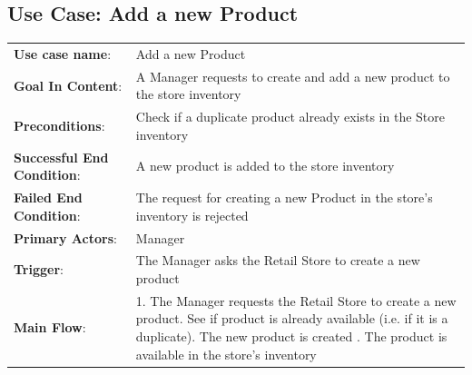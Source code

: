 \documentclass[12pt]{article}
\begin{document}
\subsection*{Use Case: Add a new Product}
\begin{center}
\begin{tabular}{ l p{} }
    \textbf{Use case name}: & Add a new Product \\
    \textbf{Goal In Content}: & A Manager requests to create and add a new product to the store inventory \\
    \textbf{Preconditions}: & Check if a duplicate product already exists in the Store inventory \\
    \textbf{Successful End Condition}: & A new product is added to the store inventory \\
    \textbf{Failed End Condition}: & The request for creating a new Product in the store’s inventory is rejected  \\
    \textbf{Primary Actors}: & Manager  \\
    \textbf{Trigger}: & The Manager asks the Retail Store to create a new product  \\
    \textbf{Main Flow}: & 1. The Manager requests the Retail Store to create a new product\newline 2. See if product is already available (i.e. if it is a duplicate)\newline 3. The new product is created \newline 4. The product is available in the store’s inventory\\
\end{tabular}
\end{center}
\end{document}
